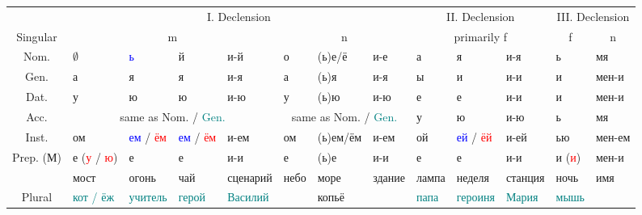 \documentclass[a4paper, landscape, 11pt]{article}
\newcommand{\an}[1]{\textcolor{teal}{#1}} %
\newcommand{\us}[1]{\textcolor{blue}{#1}} %
\newcommand{\st}[1]{\textcolor{red}{#1}}  %
\begin{document}
\begin{tabularx}{\textwidth}{|c|XXXX|XXX|XXX|XX|}
	\hline
	\strut &                                        \multicolumn{7}{c|}{I. Declension}                                         &      \multicolumn{3}{c|}{II. Declension}      &      \multicolumn{2}{c|}{III. Declension}       \\
	Singular   &                        \multicolumn{4}{c}{m}                         &    \multicolumn{3}{c|}{n}     & \multicolumn{3}{c|}{primarily f} & \multicolumn{1}{c}{f} & \multicolumn{1}{c|}{n} \\ \hline
	  Nom.    & $\emptyset$         & \us{ь}            & й                 & и-й          & о           & (ь)е/ё   & и-е        & а           & я                 & и-я        & ь                     & мя                     \\
	  Gen.    & а                   & я                 & я                 & и-я          & а           & (ь)я     & и-я        & ы           & и                 & и-и        & и                     & мен-и                  \\
	  Dat.    & у                   & ю                 & ю                 & и-ю          & у           & (ь)ю     & и-ю        & е           & е                 & и-и        & и                     & мен-и                  \\ \cline{2-8}
	  Acc.    &                    \multicolumn{4}{c|}{same as Nom. / \an{Gen.}}                     & \multicolumn{3}{c|}{same as Nom. / \an{Gen.}} & у           & ю                 & и-ю        & ь                     & мя                     \\ \cline{2-8}
	  Inst.    & ом                  & \us{ем} / \st{ём} & \us{ем} / \st{ём} & и-ем         & ом          & (ь)ем/ём & и-ем       & ой          & \us{ей} / \st{ёй} & и-ей       & ью                    & мен-ем                 \\
	Prep. (М)  & е (\st{у} / \st{ю}) & е                 & е                 & и-и          & е           & (ь)е     & и-и        & е           & е                 & и-и        & и (\st{и})            & мен-и                  \\ \hline
	\strut & мост                & огонь             & чай               & сценарий     & небо        & море     & здание     & лампа       & неделя            & станция    & ночь                  & имя                    \\
	Plural   & \an{кот / ёж}       & \an{учитель}      & \an{герой}        & \an{Василий} & \strut      & копьё    & \strut     & \an{папа}   & \an{героиня}      & \an{Мария} & \an{мышь}             & \strut                 \\ \hline

\end{tabularx}
\end{document}
